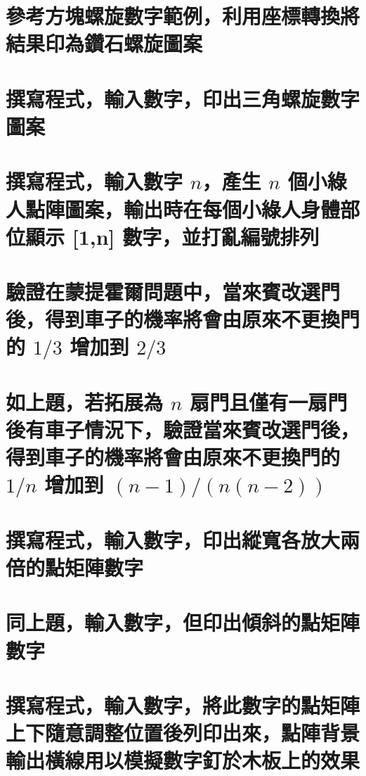 \section{參考方塊螺旋數字範例，利用座標轉換將結果印為鑽石螺旋圖案}


\section{撰寫程式，輸入數字，印出三角螺旋數字圖案}


\section{撰寫程式，輸入數字 $n$，產生 $n$ 個小綠人點陣圖案，輸出時在每個小綠人身體部位顯示 [1,n] 數字，並打亂編號排列}


\section{驗證在蒙提霍爾問題中，當來賓改選門後，得到車子的機率將會由原來不更換門的 $1/3$ 增加到 $2/3$}


\section{如上題，若拓展為 $n$ 扇門且僅有一扇門後有車子情況下，驗證當來賓改選門後，得到車子的機率將會由原來不更換門的 $1/n$ 增加到 $(n-1)/(n(n-2))$}


\section{撰寫程式，輸入數字，印出縱寬各放大兩倍的點矩陣數字}


\section{同上題，輸入數字，但印出傾斜的點矩陣數字}


\section{撰寫程式，輸入數字，將此數字的點矩陣上下隨意調整位置後列印出來，點陣背景輸出橫線用以模擬數字釘於木板上的效果}


